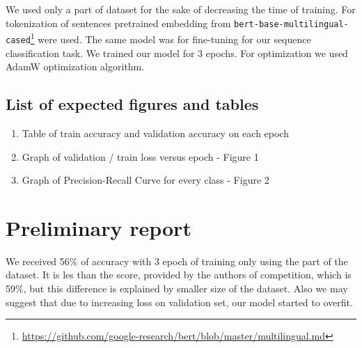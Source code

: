 \documentclass{article}
\begin{document}
We used only a part of dataset for the sake of decreasing the time of training. For tokenization of sentences pretrained embedding from \texttt{bert-base-multilingual-cased}\footnote{\url{https://github.com/google-research/bert/blob/master/multilingual.md}} were used. The same model was for fine-tuning for our sequence classification task. We trained our model for 3 epochs. For optimization we used AdamW optimization algorithm\cite{adam-w}.


\subsection{List of expected figures and tables}
\begin{enumerate}
    \item Table of train accuracy and validation accuracy on each epoch
    \item Graph of validation / train loss versus epoch - Figure 1
    \item Graph of Precision-Recall Curve for every class - Figure 2
\end{enumerate}





  
\section{Preliminary report}

We received 56$\%$ of accuracy with 3 epoch of training only using the part of the dataset. It is les than the score, provided by the authors of competition, which is 59$\%$, but this difference is explained by smaller size of the dataset. Also we may suggest that due to increasing loss on validation set, our model started to overfit.
\end{document}
